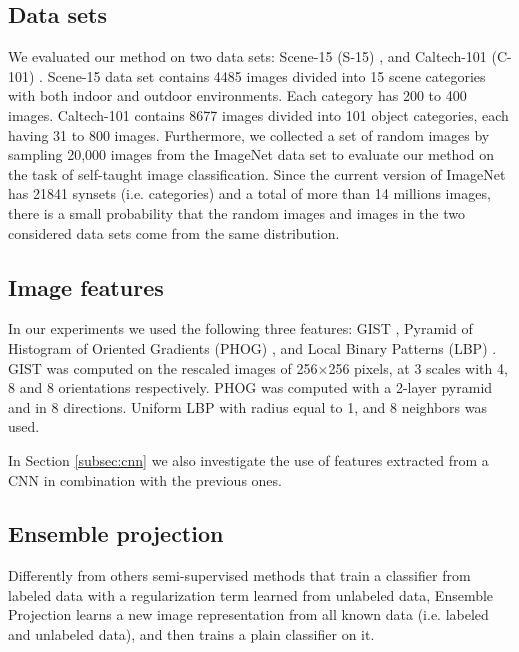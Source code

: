 \documentclass[journal,11pt]{IEEEtran}
\begin{document}
\subsection{Data sets}
We evaluated our method on two data sets: Scene-15 (S-15) \cite{lazebnik2006beyond}, and Caltech-101 (C-101) \cite{fei2007learning}.
Scene-15 data set contains 4485 images divided into 15 scene categories with both indoor and outdoor environments. Each category has 200 to 400 images.
Caltech-101 contains 8677 images divided into 101 object categories, each having 31 to 800 images.
Furthermore, we collected a set of random images by sampling 20,000 images from the ImageNet data set \cite{deng2009imagenet} to evaluate our method on the task of self-taught image classification.
Since the current version of ImageNet has 21841 synsets (i.e. categories) and a total of more than 14 millions images, there is a small probability that the random images and images in the two considered data sets  come from the same distribution.

\subsection{Image features}
In our experiments we used the following three features: GIST \cite{oliva2001modeling}, Pyramid of Histogram of Oriented Gradients (PHOG) \cite{bosch2007image}, and Local Binary Patterns (LBP) \cite{ojala2002multiresolution}.
GIST was computed on the rescaled images of 256$\times$256 pixels, at 3 scales with 4, 8 and 8 orientations respectively.
PHOG was computed with a 2-layer pyramid and in 8 directions.
Uniform LBP with radius equal to 1, and 8 neighbors was used.

In Section \ref{subsec:cnn} we also investigate the use of features extracted from a CNN \cite{razavian2014cnn} in combination with the previous ones.

\subsection{Ensemble projection}
\label{sec:EP}
Differently from others semi-supervised methods that train a classifier
from labeled data with a regularization term learned from unlabeled data, Ensemble Projection \cite{dai2013ensemble} learns a new image representation from all known data (i.e. labeled and unlabeled data), and then trains a plain classifier
on it.
\end{document}
